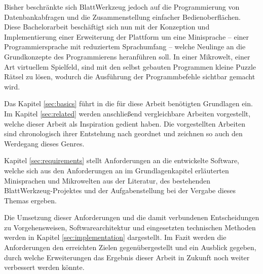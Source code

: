 Bisher beschränkte sich BlattWerkzeug jedoch auf die Programmierung von Datenbankabfragen und die Zusammenstellung einfacher Bedienoberflächen. Diese Bachelorarbeit beschäftigt sich nun mit der Konzeption und Implementierung einer Erweiterung der Plattform um eine Minisprache -- einer Programmiersprache mit reduziertem Sprachumfang -- welche Neulinge an die Grundkonzepte des Programmierens heranführen soll. In einer Mikrowelt, einer Art virtuellem Spielfeld, sind mit den selbst gebauten Programmen kleine Puzzle Rätsel zu lösen, wodurch die Ausführung der Programmbefehle sichtbar gemacht wird.

Das Kapitel \ref{sec:basics} führt in die für diese Arbeit benötigten Grundlagen ein. Im Kapitel \ref{sec:related} werden anschließend vergleichbare Arbeiten vorgestellt, welche dieser Arbeit als Inspiration gedient haben. Die vorgestellten Arbeiten sind chronologisch ihrer Entstehung nach geordnet und zeichnen so auch den Werdegang dieses Genres.

Kapitel \ref{sec:requirements} stellt Anforderungen an die entwickelte Software, welche sich aus den Anforderungen an im Grundlagenkapitel erläuterten Minisprachen und Mikrowelten aus der Literatur, des bestehenden BlattWerkzeug-Projektes und der Aufgabenstellung bei der Vergabe dieses Themas ergeben.

Die Umsetzung dieser Anforderungen und die damit verbundenen Entscheidungen zu Vorgehensweisen, Softwarearchitektur und eingesetzten technischen Methoden werden in Kapitel \ref{sec:implementation} dargestellt. Im Fazit werden die Anforderungen den erreichten Zielen gegenübergestellt und ein Ausblick gegeben, durch welche Erweiterungen das Ergebnis dieser Arbeit in Zukunft noch weiter verbessert werden könnte.

